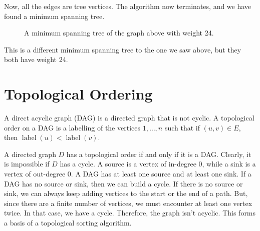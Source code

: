 \documentclass[a4paper, openany]{memoir}
\begin{document}
\noindent Now, all the edges are tree vertices. The algorithm now terminates, and we have found a minimum spanning tree.
\begin{figure}[H]
    \centering
    \caption{A minimum spanning tree of the graph above with weight 24.}
\end{figure}
\noindent This is a different minimum spanning tree to the one we saw above, but they both have weight 24.
\newpage

\section{Topological Ordering}
A direct acyclic graph (DAG) is a directed graph that is not cyclic. A topological order on a DAG is a labelling of the vertices $1, \dots, n$ such that if $(u, v) \in E$, then $\operatorname{label} (u) < \operatorname{label}(v)$.

A directed graph $D$ has a topological order if and only if it is a DAG. Clearly, it is impossible if $D$ has a cycle. A source is a vertex of in-degree 0, while a sink is a vertex of out-degree 0. A DAG has at least one source and at least one sink. If a DAG has no source or sink, then we can build a cycle. If there is no source or sink, we can always keep adding vertices to the start or the end of a path. But, since there are a finite number of vertices, we must encounter at least one vertex twice. In that case, we have a cycle. Therefore, the graph isn't acyclic. This forms a basis of a topological sorting algorithm.
\end{document}
